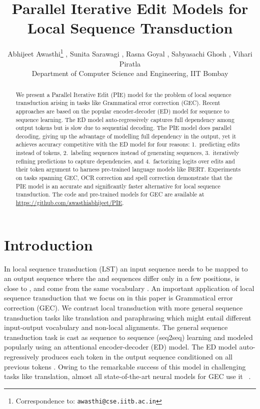 \documentclass[11pt,a4paper]{article}
\title{Parallel Iterative Edit Models for Local Sequence Transduction}
\author{Abhijeet Awasthi\thanks{\enspace Correspondence to: {\tt awasthi@cse.iitb.ac.in}}
,
  Sunita Sarawagi
,
  Rasna Goyal 
,
  Sabyasachi Ghosh 
,
  Vihari Piratla \\
  Department of Computer Science and Engineering, IIT Bombay
}
\begin{document}
\maketitle
\begin{abstract}
We present a Parallel Iterative Edit (PIE) model for the problem of local sequence transduction arising in tasks like Grammatical error correction (GEC). Recent  approaches are based on the popular encoder-decoder (ED) model for sequence to sequence learning. The ED model auto-regressively captures full dependency among output tokens but is slow due to sequential decoding. The PIE model does parallel decoding, giving up the advantage of modelling full dependency in the output, yet it achieves accuracy competitive with the ED model for four reasons: 1.~predicting edits instead of tokens, 2.~labeling sequences instead of generating sequences, 3.~iteratively refining predictions to capture dependencies, and 4.~factorizing logits over edits and their token argument to harness pre-trained language models like BERT. Experiments on tasks spanning GEC, OCR correction and spell correction demonstrate that the PIE model is an accurate and significantly faster alternative for local sequence transduction. The code and pre-trained models for GEC are available at \url{https://github.com/awasthiabhijeet/PIE}.
\end{abstract}

\section{Introduction}
\label{submission}
In local sequence transduction (LST) an input sequence  needs to be mapped to an output sequence  where the  and  sequences differ only in a few positions,  is close to , and  come from the same vocabulary . An important application of local sequence transduction that we focus on in this paper is Grammatical error correction (GEC). We contrast local transduction with more general sequence transduction tasks like translation and paraphrasing which might entail different input-output vocabulary and non-local alignments. The general sequence transduction task is cast as sequence to sequence (seq2seq) learning and modeled popularly using an attentional encoder-decoder (ED) model. The ED model  auto-regressively produces each token  in the output sequence conditioned on all previous tokens . Owing to the remarkable success of this model in challenging tasks like translation, almost all state-of-the-art neural models for GEC use it ~\cite{zhao2019improving,lichtarge2019,ge2018reaching,chollampatt2018neural,junczys2018approaching}. 
\end{document}
